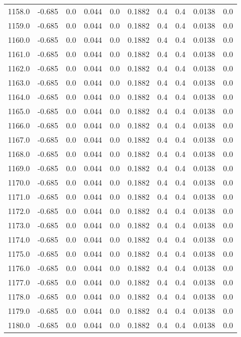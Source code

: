 \begin{longtable}{lrrrrrrrrr}
1158.0 & -0.685 & 0.0 & 0.044 & 0.0 & 0.1882 & 0.4 & 0.4 & 0.0138 & 0.0 \\
1159.0 & -0.685 & 0.0 & 0.044 & 0.0 & 0.1882 & 0.4 & 0.4 & 0.0138 & 0.0 \\
1160.0 & -0.685 & 0.0 & 0.044 & 0.0 & 0.1882 & 0.4 & 0.4 & 0.0138 & 0.0 \\
1161.0 & -0.685 & 0.0 & 0.044 & 0.0 & 0.1882 & 0.4 & 0.4 & 0.0138 & 0.0 \\
1162.0 & -0.685 & 0.0 & 0.044 & 0.0 & 0.1882 & 0.4 & 0.4 & 0.0138 & 0.0 \\
1163.0 & -0.685 & 0.0 & 0.044 & 0.0 & 0.1882 & 0.4 & 0.4 & 0.0138 & 0.0 \\
1164.0 & -0.685 & 0.0 & 0.044 & 0.0 & 0.1882 & 0.4 & 0.4 & 0.0138 & 0.0 \\
1165.0 & -0.685 & 0.0 & 0.044 & 0.0 & 0.1882 & 0.4 & 0.4 & 0.0138 & 0.0 \\
1166.0 & -0.685 & 0.0 & 0.044 & 0.0 & 0.1882 & 0.4 & 0.4 & 0.0138 & 0.0 \\
1167.0 & -0.685 & 0.0 & 0.044 & 0.0 & 0.1882 & 0.4 & 0.4 & 0.0138 & 0.0 \\
1168.0 & -0.685 & 0.0 & 0.044 & 0.0 & 0.1882 & 0.4 & 0.4 & 0.0138 & 0.0 \\
1169.0 & -0.685 & 0.0 & 0.044 & 0.0 & 0.1882 & 0.4 & 0.4 & 0.0138 & 0.0 \\
1170.0 & -0.685 & 0.0 & 0.044 & 0.0 & 0.1882 & 0.4 & 0.4 & 0.0138 & 0.0 \\
1171.0 & -0.685 & 0.0 & 0.044 & 0.0 & 0.1882 & 0.4 & 0.4 & 0.0138 & 0.0 \\
1172.0 & -0.685 & 0.0 & 0.044 & 0.0 & 0.1882 & 0.4 & 0.4 & 0.0138 & 0.0 \\
1173.0 & -0.685 & 0.0 & 0.044 & 0.0 & 0.1882 & 0.4 & 0.4 & 0.0138 & 0.0 \\
1174.0 & -0.685 & 0.0 & 0.044 & 0.0 & 0.1882 & 0.4 & 0.4 & 0.0138 & 0.0 \\
1175.0 & -0.685 & 0.0 & 0.044 & 0.0 & 0.1882 & 0.4 & 0.4 & 0.0138 & 0.0 \\
1176.0 & -0.685 & 0.0 & 0.044 & 0.0 & 0.1882 & 0.4 & 0.4 & 0.0138 & 0.0 \\
1177.0 & -0.685 & 0.0 & 0.044 & 0.0 & 0.1882 & 0.4 & 0.4 & 0.0138 & 0.0 \\
1178.0 & -0.685 & 0.0 & 0.044 & 0.0 & 0.1882 & 0.4 & 0.4 & 0.0138 & 0.0 \\
1179.0 & -0.685 & 0.0 & 0.044 & 0.0 & 0.1882 & 0.4 & 0.4 & 0.0138 & 0.0 \\
1180.0 & -0.685 & 0.0 & 0.044 & 0.0 & 0.1882 & 0.4 & 0.4 & 0.0138 & 0.0 \\

\end{longtable}
